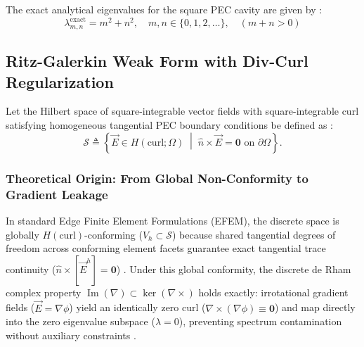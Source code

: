 \documentclass[preprint,12pt]{elsarticle}
\begin{document}
The exact analytical eigenvalues for the square PEC cavity are given by \cite{harrington2001time}:
\begin{equation}
\lambda_{m,n}^{\mathrm{exact}} = m^2 + n^2, \quad m,n \in \{0, 1, 2, \dots\}, \quad (m+n > 0)
\label{eq:analytical_eigenvalues}
\end{equation}

\subsection{Ritz-Galerkin Weak Form with Div-Curl Regularization}
\label{subsec:weak_form_regularization}
Let the Hilbert space of square-integrable vector fields with square-integrable curl satisfying homogeneous tangential PEC boundary conditions be defined as \cite{monk2003finite, bossavit1998computational}:
\begin{equation}
\mathcal{S} \triangleq \left\{ \vec{E} \in H(\mathrm{curl}; \Omega) \;\middle|\; \hat{n} \times \vec{E} = \mathbf{0} \text{ on } \partial\Omega \right\}.
\label{eq:hilbert_space_S}
\end{equation}

\subsubsection{Theoretical Origin: From Global Non-Conformity to Gradient Leakage}
In standard Edge Finite Element Formulations (EFEM), the discrete space is globally $H(\mathrm{curl})$-conforming ($V_h \subset \mathcal{S}$) because shared tangential degrees of freedom across conforming element facets guarantee exact tangential trace continuity ($\hat{n} \times [\vec{E}^h] = \mathbf{0}$) \cite{monk2003finite, bossavit1990spurious}. Under this global conformity, the discrete de Rham complex property $\operatorname{Im}(\nabla) \subset \ker(\nabla \times)$ holds exactly: irrotational gradient fields ($\vec{E} = \nabla \phi$) yield an identically zero curl ($\nabla \times (\nabla \phi) \equiv \mathbf{0}$) and map directly into the zero eigenvalue subspace ($\lambda = 0$), preventing spectrum contamination without auxiliary constraints \cite{monk2003finite, boffi1999computational}.
\end{document}
